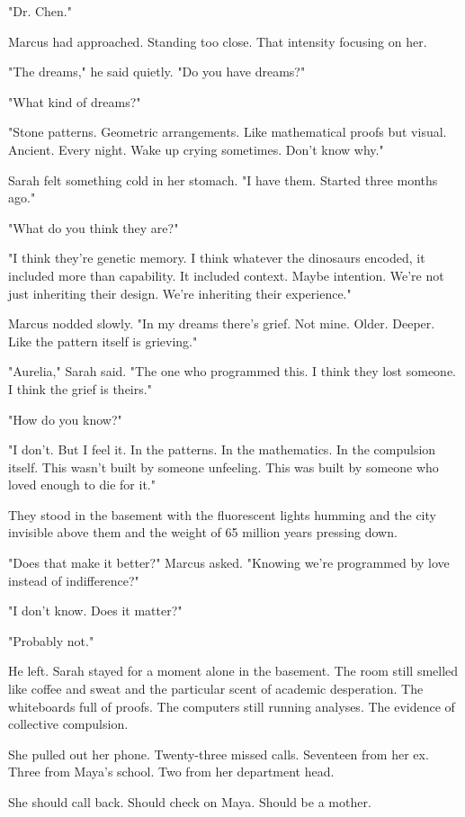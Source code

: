 "Dr. Chen."

Marcus had approached. Standing too close. That intensity focusing on her.

"The dreams," he said quietly. "Do you have dreams?"

"What kind of dreams?"

"Stone patterns. Geometric arrangements. Like mathematical proofs but visual. Ancient. Every night. Wake up crying sometimes. Don't know why."

Sarah felt something cold in her stomach. "I have them. Started three months ago."

"What do you think they are?"

"I think they're genetic memory. I think whatever the dinosaurs encoded, it included more than capability. It included context. Maybe intention. We're not just inheriting their design. We're inheriting their experience."

Marcus nodded slowly. "In my dreams there's grief. Not mine. Older. Deeper. Like the pattern itself is grieving."

"Aurelia," Sarah said. "The one who programmed this. I think they lost someone. I think the grief is theirs."

"How do you know?"

"I don't. But I feel it. In the patterns. In the mathematics. In the compulsion itself. This wasn't built by someone unfeeling. This was built by someone who loved enough to die for it."

They stood in the basement with the fluorescent lights humming and the city invisible above them and the weight of 65 million years pressing down.

"Does that make it better?" Marcus asked. "Knowing we're programmed by love instead of indifference?"

"I don't know. Does it matter?"

"Probably not."

He left. Sarah stayed for a moment alone in the basement. The room still smelled like coffee and sweat and the particular scent of academic desperation. The whiteboards full of proofs. The computers still running analyses. The evidence of collective compulsion.

She pulled out her phone. Twenty-three missed calls. Seventeen from her ex. Three from Maya's school. Two from her department head.

She should call back. Should check on Maya. Should be a mother.

